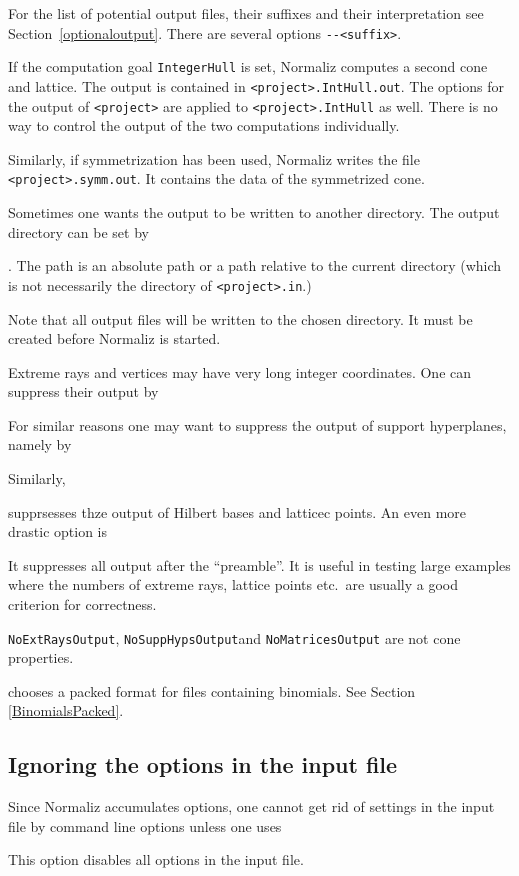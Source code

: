 For the list of potential output files, their suffixes and their interpretation
see Section~\ref{optionaloutput}. There are several options \verb|--<suffix>|.

If the computation goal \verb|IntegerHull| is set, Normaliz computes a second cone and lattice. The output is contained in \verb|<project>.IntHull.out|. The options for the output of \verb|<project>| are applied to \verb|<project>.IntHull| as well. There is no way to control the output of the two computations individually.

Similarly, if symmetrization has been used, Normaliz writes the file \verb|<project>.symm.out|. It contains the data of the symmetrized cone.

Sometimes one wants the output to be written to another directory. The output directory can be set by
\begin{itemize}
	. The path  is an absolute path or a path relative to the current directory (which is not necessarily the directory of \verb|<project>.in|.)
\end{itemize}
Note that all output files will be written to the chosen directory. It must be created before Normaliz is started.

Extreme rays and vertices may have very long integer coordinates. One can suppress their output by
\begin{itemize}
	\itemtt[NoExtRaysOutput]
\end{itemize}
For similar reasons one may want to suppress the output of support hyperplanes, namely by
\begin{itemize}
	\itemtt[NoSuppHypsOutput]
\end{itemize}
Similarly,
\begin{itemize}
	\itemtt[NoHilbertBasisOutput]
\end{itemize}
supprsesses thze output of Hilbert bases and latticec points.
An even more drastic option is
\begin{itemize}
	\itemtt[NoMatricesOutput]
\end{itemize}
It suppresses all output after the ``preamble''. It is useful in testing large examples where the numbers of extreme rays, lattice points etc.\ are usually a good criterion for correctness.

\verb|NoExtRaysOutput|, \verb|NoSuppHypsOutput|and \verb|NoMatricesOutput| are not cone properties.

\begin{itemize}
	\itemtt[BinomialsPacked] chooses a packed format for files containing binomials. See Section \ref{BinomialsPacked}.
\end{itemize}


\subsection{Ignoring the options in the input file}

Since Normaliz accumulates options, one cannot get rid of settings in the input file by command line options unless one uses
\begin{itemize}
	\itemtt[{-}{-}ignore, -i] This option disables all options in the input file.
\end{itemize}
